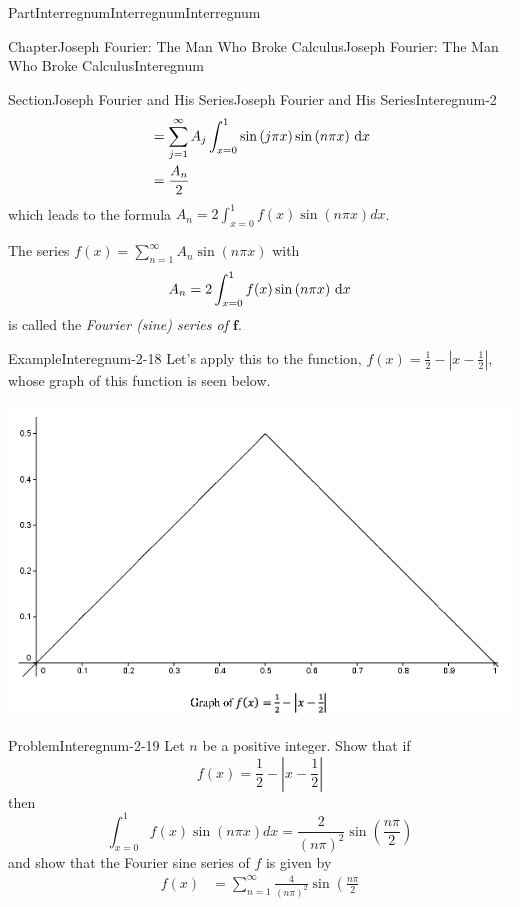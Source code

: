 \documentclass[oneside,10pt,]{book}
\numberwithin{equation}{part}
\newcommand{\dx}[1]{\,{\rm d}#1}
\newcommand{\abs}[1]{\left|#1\right|}
\newcommand{\amp}{&}
\begin{document}
\begin{partptx}{Part}{Interregnum}{}{Interregnum}{}{}{Interregnum}
\begin{chapterptx}{Chapter}{Joseph Fourier: The Man Who Broke Calculus}{}{Joseph Fourier: The Man Who Broke Calculus}{}{}{Interegnum}
\begin{sectionptx}{Section}{Joseph Fourier and His Series}{}{Joseph Fourier and His Series}{}{}{Interegnum-2}
\begin{align*}
\amp =\sum_{j=1}^\infty A_j\int_{x=0}^1\sin\left(j\pi x\right)\sin\left(n\pi x\right)\dx{ x}\\
\amp =\frac{A_n}{2}
\end{align*}
which leads to the formula \(A_n=2\int_{x=0}^1f(x)\sin\left(n\pi x\right)d x\).%
\par
The series \(f(x)=\sum_{n=1}^\infty A_n\sin\left(n\pi
x\right)\) with%
\begin{equation*}
A_n=2\int_{x=0}^1f(x)\sin\left(n\pi
x\right)\dx{ x}
\end{equation*}
is called the \emph{Fourier (sine) series of \(\boldsymbol{f}\)}.%
\begin{example}{Example}{}{Interegnum-2-18}%
Let's apply this to the function, \(f(x)=\frac{1}{2}-\abs{x-\frac{1}{2}}\), whose graph of this function is seen below.%
\begin{image}{0.125}{0.75}{0.125}{}%
\includegraphics[width=\linewidth]{external/images/FourierEx1.png}
\end{image}%
\end{example}
\begin{problem}{Problem}{}{Interegnum-2-19}%
 Let \(n\) be a positive integer. Show that if%
\begin{equation*}
f(x)=\frac{1}{2}-\abs{x-\frac{1}{2}}
\end{equation*}
then%
\begin{equation*}
\int_{x=0}^1f(x)\sin\left(n\pi x\right)d x = \frac{2}{\left(n\pi\right)^2}\sin\left(\frac{n\pi}{2}\right)
\end{equation*}
and show that the Fourier sine series of \(f\) is given by%
\begin{align*}
f(x)\amp{}=\sum_{n=1}^\infty\frac{4}{\left(n\pi\right)^2}\sin\left(\frac{n\pi}{2}

\end{align*}
\end{problem}
\end{sectionptx}
\end{chapterptx}
\end{partptx}
\end{document}
